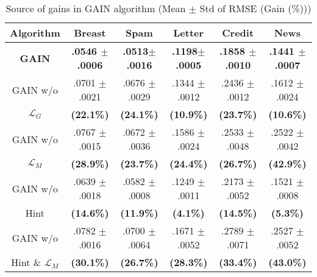 \documentclass{article}
\begin{document}
    \begin{table*}[t!]
        \renewcommand{\arraystretch}{1.3}
        \caption{Source of gains in GAIN algorithm (Mean $\pm$ Std of RMSE (Gain (\%)))}    
        \label{table:sourceofgain}
        \centering
        \begin{tabular}{ |c|| c | c  |  c| c | c |  }
            \toprule
            \textbf{Algorithm}    & \textbf{Breast} &  \textbf{Spam} & \textbf{Letter}& \textbf{Credit} & \textbf{News}   \\ \midrule
            \textbf{GAIN} & \textbf{.0546 $\pm$ .0006} & \textbf{.0513$\pm$ .0016} & \textbf{.1198$\pm$ .0005}  & \textbf{.1858 $\pm$ .0010} & \textbf{.1441 $\pm$ .0007}  \\   \midrule
            GAIN w/o  & .0701 $\pm$ .0021  & .0676 $\pm$ .0029 & .1344 $\pm$ .0012  & .2436 $\pm$ .0012 & .1612 $\pm$ .0024   \\ 
             $\mathcal{L}_G$& \textbf{(22.1\%)} & \textbf{(24.1\%) }& \textbf{(10.9\%) }& \textbf{(23.7\%)} & \textbf{(10.6\%)} \\  \midrule
            GAIN w/o   & .0767 $\pm$ .0015 & .0672 $\pm$ .0036 & .1586 $\pm$ .0024 & .2533 $\pm$ .0048 & .2522 $\pm$ .0042  \\
            $\mathcal{L}_M$& \textbf{(28.9\%)} & \textbf{(23.7\%) }& \textbf{(24.4\%) }& \textbf{(26.7\%)} & \textbf{(42.9\%)}\\   \midrule
            GAIN w/o  & .0639 $\pm$ .0018 & .0582 $\pm$ .0008 & .1249 $\pm$ .0011  & .2173 $\pm$ .0052 & .1521 $\pm$ .0008   \\ 
            Hint & \textbf{(14.6\%)} & \textbf{(11.9\%)} & \textbf{(4.1\%)} & \textbf{(14.5\%)} & \textbf{(5.3\%)} \\  \midrule
            GAIN w/o   &.0782 $\pm$ .0016  & .0700 $\pm$ .0064& .1671 $\pm$ .0052 & .2789 $\pm$ .0071& .2527 $\pm$ .0052  \\
            Hint \& $\mathcal{L}_M$ & \textbf{(30.1\%)} & \textbf{(26.7\%)} & \textbf{(28.3\%)} & \textbf{(33.4\%)} & \textbf{(43.0\%)}\\
            \bottomrule
        \end{tabular}
    \end{table*}
\end{document}
